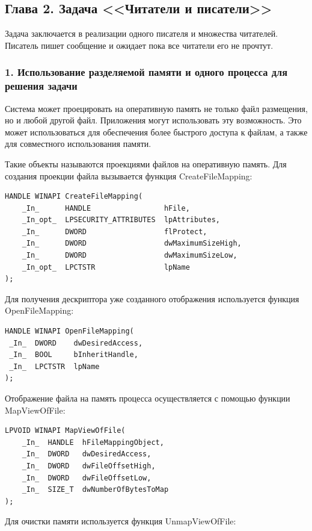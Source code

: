 \documentclass[14pt,a4paper,report]{report}
\begin{document}
\subsection{Глава 2. Задача <<Читатели и писатели>>}

Задача заключается в реализации одного писателя и множества читателей. Писатель пишет сообщение и ожидает пока все читатели его не прочтут.

\subsubsection{1. Использование разделяемой памяти и одного процесса для решения задачи}

Система может проецировать на оперативную память не только файл размещения, но и любой другой файл. Приложения могут использовать эту возможность. Это может использоваться для обеспечения более быстрого доступа к файлам, а также для совместного использования памяти.
 
Такие объекты называются проекциями файлов на оперативную память. Для создания проекции файла вызывается функция CreateFileMapping:

\begin{verbatim}
HANDLE WINAPI CreateFileMapping(
    _In_      HANDLE                 hFile,
    _In_opt_  LPSECURITY_ATTRIBUTES  lpAttributes,
    _In_      DWORD                  flProtect,
    _In_      DWORD                  dwMaximumSizeHigh,
    _In_      DWORD                  dwMaximumSizeLow,
    _In_opt_  LPCTSTR                lpName
);
\end{verbatim}

Для получения дескриптора уже созданного отображения используется функция OpenFileMapping:

\begin{verbatim}
HANDLE WINAPI OpenFileMapping(
 _In_  DWORD    dwDesiredAccess,
 _In_  BOOL     bInheritHandle,
 _In_  LPCTSTR  lpName
);
\end{verbatim}

Отображение файла на память процесса осуществляется с помощью функции MapViewOfFile:

\begin{verbatim}
LPVOID WINAPI MapViewOfFile(
    _In_  HANDLE  hFileMappingObject,
    _In_  DWORD   dwDesiredAccess,
    _In_  DWORD   dwFileOffsetHigh,
    _In_  DWORD   dwFileOffsetLow,
    _In_  SIZE_T  dwNumberOfBytesToMap
);
\end{verbatim}

Для очистки памяти используется функция UnmapViewOfFile:
\end{document}
